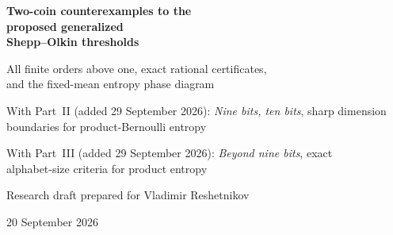 \documentclass[11pt]{article}
\numberwithin{equation}{section}
\theoremstyle{definition}
\theoremstyle{remark}
\begin{document}
\hypersetup{pageanchor=false}
\begin{titlepage}
\thispagestyle{empty}
\vspace*{1.0cm}
\begin{center}
{\LARGE\bfseries\color{Ink} Two-coin counterexamples to the\\[.25em]
proposed generalized\\[.25em] Shepp--Olkin thresholds\par}
\vspace{.7cm}
{\large All finite orders above one, exact rational certificates,\\
and the fixed-mean entropy phase diagram\par}
\vspace{.35cm}
{\normalsize With Part~II (added 29 September 2026): \emph{Nine bits, ten
bits}, sharp dimension\\ boundaries for product-Bernoulli entropy\par}
\vspace{.2cm}
{\normalsize With Part~III (added 29 September 2026): \emph{Beyond nine
bits}, exact\\ alphabet-size criteria for product entropy\par}
\vspace{.6cm}
{\normalsize Research draft prepared for Vladimir Reshetnikov\par}
\vspace{.2cm}
{\normalsize 20 September 2026\par}
\end{center}
\vspace{.7cm}
\begin{abstract}
Hillion and Johnson proposed that the R\'enyi entropy of a sum of independent
Bernoulli variables is jointly concave in the Bernoulli parameters up to order
$2$, and that the corresponding Tsallis threshold is approximately $3.65986$.
We give a counterexample to both proposed numerical thresholds. In fact, for
every finite real $q>1$, both entropies fail even quasiconcavity for the sum of
\emph{two} independent Bernoulli variables, with all parameters strictly between
zero and one. The obstruction is a mean-preserving interpolation
$(p+t,p-t)$ near the all-zero corner. Its power sum has a negative second
variation at the balanced point when $p$ is sufficiently small.

The counterexamples admit a fully explicit dyadic family. At $q=2$, one
particularly small certificate has midpoint $(1/10,1/10)$ and endpoints
$(3/20,1/20)$ and $(1/20,3/20)$; the Tsallis midpoint deficit is exactly
$181/80000$. We also determine the sharp balanced-point curvature transition,
classify every fixed-mean two-coin entropy maximizer for $q>1$, prove concavity
on all two-coin fixed-mean segments for $0<q\leq1$, and identify the minimum
number of coins needed for failure. The transition near $q=1$ occurs on an
exponentially small parameter scale.


\end{abstract}
\end{titlepage}
\end{document}
